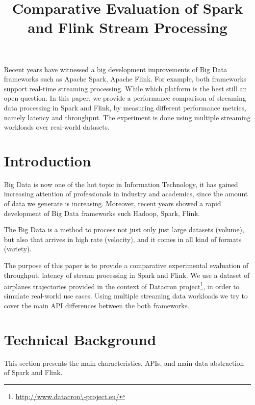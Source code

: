 \documentclass[]{article}
\title{Comparative Evaluation of Spark and Flink Stream Processing}
\begin{document}
\maketitle
\newpage
\tableofcontents

\newpage


\begin{abstract}

\end{abstract}
Recent years have witnessed a big development improvements of Big Data frameworks such as Apache Spark, Apache Flink. For example, both frameworks support real-time
streaming processing. While which platform is the best still an open question. 
In this paper, we provide a performance comparison of streaming data processing in Spark and Flink, by measuring different performance metrics, namely latency and throughput. The experiment is done using multiple streaming workloads over real-world datasets.
\section{Introduction}

\par Big Data is now one of the hot topic in Information Technology, it has gained increasing attention of professionals in industry and academics, since the amount of data we generate is increasing. Moreover, recent years showed a rapid development of Big Data frameworks such Hadoop, Spark, Flink.    
 \par The Big Data is a method to process not just only just large datasets (volume), but also that arrives in high rate (velocity), and it comes in all kind of formats (variety)\cite{svs}.


\par The purpose of this paper is to provide a comparative experimental evaluation of throughput, latency of stream processing in Spark and Flink. We use a dataset of airplanes trajectories provided in
the context of Datacron project\footnote{\url{http://www.datacron\-project.eu/}}, in order to simulate real-world use cases. Using multiple streaming data workloads we try to cover the main API differences between the both frameworks.


\section{Technical Background}
This section presents the main characteristics, APIs, and main data abstraction of Spark and Flink.
\end{document}
